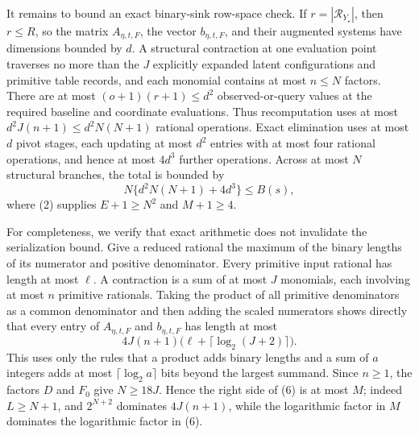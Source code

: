 It remains to bound an exact binary-sink row-space check.  If \(r=|\mathcal R_{Y_{\star}}|\), then \(r\leq R\), so the matrix \(A_{\eta,t,F}\), the vector \(b_{\eta,t,F}\), and their augmented systems have dimensions bounded by \(d\).  A structural contraction at one evaluation point traverses no more than the \(J\) explicitly expanded latent configurations and primitive table records, and each monomial contains at most \(n\leq N\) factors.  There are at most \((o+1)(r+1)\leq d^2\) observed-or-query values at the required baseline and coordinate evaluations.  Thus recomputation uses at most \(d^2J(n+1)\leq d^2N(N+1)\) rational operations.  Exact elimination uses at most \(d\) pivot stages, each updating at most \(d^2\) entries with at most four rational operations, and hence at most \(4d^3\) further operations.  Across at most \(N\) structural branches, the total is bounded by
\[
 N\{d^2N(N+1)+4d^3\}\leq B(s), \tag{5}
\]
where (2) supplies \(E+1\geq N^2\) and \(M+1\geq 4\).

For completeness, we verify that exact arithmetic does not invalidate the serialization bound.  Give a reduced rational the maximum of the binary lengths of its numerator and positive denominator.  Every primitive input rational has length at most \(\ell\).  A contraction is a sum of at most \(J\) monomials, each involving at most \(n\) primitive rationals.  Taking the product of all primitive denominators as a common denominator and then adding the scaled numerators shows directly that every entry of \(A_{\eta,t,F}\) and \(b_{\eta,t,F}\) has length at most
\[
 4J(n+1)\bigl(\ell+\lceil\log_2(J+2)\rceil\bigr). \tag{6}
\]
This uses only the rules that a product adds binary lengths and a sum of \(a\) integers adds at most \(\lceil\log_2 a\rceil\) bits beyond the largest summand.  Since \(n\geq1\), the factors \(D\) and \(F_0\) give \(N\geq18J\).  Hence the right side of (6) is at most \(M\); indeed \(L\geq N+1\), and \(2^{N+2}\) dominates \(4J(n+1)\), while the logarithmic factor in \(M\) dominates the logarithmic factor in (6).

